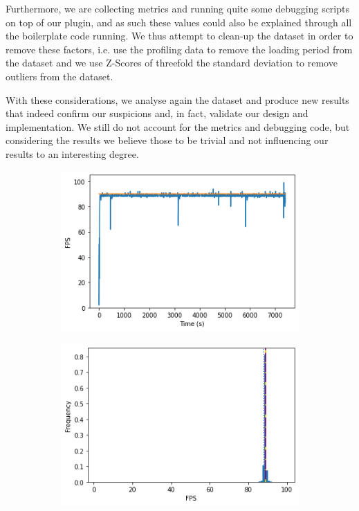 Furthermore, we are collecting metrics and running quite some debugging scripts on top of our plugin, and as such these values could also be explained through all the boilerplate code running. We thus attempt to clean-up the dataset in order to remove these factors, i.e. use the profiling data to remove the loading period from the dataset and we use Z-Scores of threefold the standard deviation to remove outliers from the dataset.

With these considerations, we analyse again the dataset and produce new results that indeed confirm our suspicions and, in fact, validate our design and implementation. We still do not account for the metrics and debugging code, but considering the results we believe those to be trivial and not influencing our results to an interesting degree.

\begin{figure}[t]
    \centering
    \begin{subfigure}{.45\textwidth}
        \centering
        \includegraphics[width=\textwidth]{pictures/analysis cone/output_5_0.png}
        \caption{}
    \end{subfigure}
    \begin{subfigure}{.45\textwidth}
        \centering
        \includegraphics[width=\textwidth]{pictures/analysis cone/output_6_0.png}

\end{subfigure}
\end{figure}
